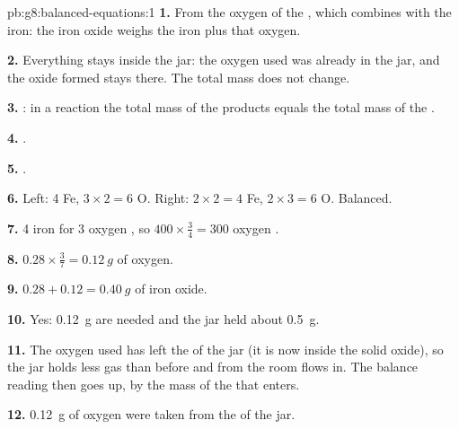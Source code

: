 \begin{solution}{pb:g8:balanced-equations:1}
\textbf{1.} From the oxygen of the , which combines with the iron:
the iron oxide weighs the iron plus that oxygen.

\textbf{2.} Everything stays inside the jar: the oxygen used was already
in the jar, and the oxide formed stays there. The total mass does not
change.

\textbf{3.} : in a reaction the total mass of the
products equals the total mass of the .

\textbf{4.} .

\textbf{5.} .

\textbf{6.} Left: 4 Fe, $3 \times 2 = 6$ O. Right: $2 \times 2 = 4$ Fe,
$2 \times 3 = 6$ O. Balanced.

\textbf{7.} 4 iron  for 3 oxygen , so $400 \times
\frac{3}{4} = 300$ oxygen .

\textbf{8.} $0.28 \times \frac{3}{7} = \qty{0.12}{g}$ of oxygen.

\textbf{9.} $0.28 + 0.12 = \qty{0.40}{g}$ of iron oxide.

\textbf{10.} Yes: \qty{0.12}{g} are needed and the jar held about
\qty{0.5}{g}.

\textbf{11.} The oxygen used has left the  of the jar (it is now
inside the solid oxide), so the jar holds less gas than before and 
from the room flows in. The balance reading then goes up, by the mass of
the  that enters.

\textbf{12.} \qty{0.12}{g} of oxygen were taken from the  of the jar.
\end{solution}
